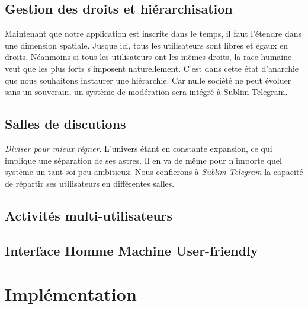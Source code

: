\documentclass[a4paper, 12pt]{article}
\begin{document}
\subsection{Gestion des droits et hiérarchisation}
Maintenant que notre application est inscrite dans le temps, il faut l'étendre dans une dimension spatiale. Jusque ici, tous les utilisateurs sont libres et égaux en droits. Néanmoins si tous les utilisateurs ont les mêmes droits, la race humaine veut que les plus forts s'imposent naturellement. C'est dans cette état d'anarchie que nous souhaitons instaurer une hiérarchie. Car nulle société ne peut évoluer sans un souverain, un système de modération sera intégré à Sublim Telegram.  
\subsection{Salles de discutions}
\emph{Diviser pour mieux régner}. 
L'univers étant en constante expansion, ce qui implique une séparation de ses astres. Il en va de même pour n'importe quel système un tant soi peu ambitieux. Nous confierons à \emph{Sublim Telegram} la capacité de répartir ses utilisateurs en différentes salles.   
\subsection{Activités multi-utilisateurs}

\subsection{Interface Homme Machine User-friendly}

\section{Implémentation}
\end{document}
